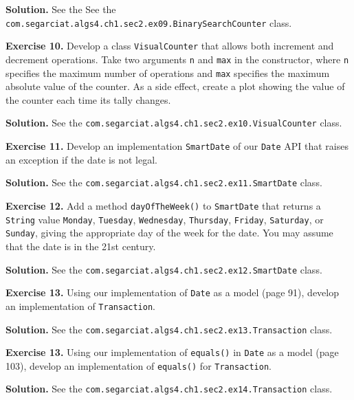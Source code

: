 \documentclass[12pt, a4paper]{article}
\newenvironment{ex}[2][Exercise]
{\par\medskip\noindent \textbf{#1 #2.}}
{\medskip}
\newenvironment{sol}[1][Solution]
{\par\medskip\noindent \textbf{#1.} }
{\medskip}
\begin{document}
	\begin{sol}
		See the See the \texttt{com.segarciat.algs4.ch1.sec2.ex09.BinarySearchCounter} class.
	\end{sol}
	\begin{ex}{10}
		Develop a class \texttt{VisualCounter} that allows both increment and decrement
		operations. Take two arguments \texttt{n} and \texttt{max} in the constructor,
		where \texttt{n} specifies the maximum number of operations and \texttt{max} specifies
		the maximum absolute value of the counter. As a side effect, create a plot showing the
		value of the counter each time its tally changes.
	\end{ex}
	\begin{sol}
		See the \texttt{com.segarciat.algs4.ch1.sec2.ex10.VisualCounter} class.
	\end{sol}
	\begin{ex}{11}
		Develop an implementation \texttt{SmartDate} of our \texttt{Date} API that raises
		an exception if the date is not legal.
	\end{ex}
	\begin{sol}
		See the \texttt{com.segarciat.algs4.ch1.sec2.ex11.SmartDate} class.
	\end{sol}
	\begin{ex}{12}
		Add a method \texttt{dayOfTheWeek()} to \texttt{SmartDate} that returns a \texttt{String}
		value \texttt{Monday}, \texttt{Tuesday}, \texttt{Wednesday}, \texttt{Thursday},
		\texttt{Friday}, \texttt{Saturday}, or \texttt{Sunday}, giving the appropriate
		day of the week for the date. You may assume that the date is in the 21st  century.
	\end{ex}
	\begin{sol}
		See the \texttt{com.segarciat.algs4.ch1.sec2.ex12.SmartDate} class.
	\end{sol}
	\begin{ex}{13}
		Using our implementation of \texttt{Date} as a model (page 91), develop an implementation
		of \texttt{Transaction}.
	\end{ex}
	\begin{sol}
		See the \texttt{com.segarciat.algs4.ch1.sec2.ex13.Transaction} class.
	\end{sol}
	\begin{ex}{13}
		Using our implementation of \texttt{equals()} in \texttt{Date} as a model (page 103),
		develop an implementation of \texttt{equals()} for \texttt{Transaction}.
	\end{ex}
	\begin{sol}
		See the \texttt{com.segarciat.algs4.ch1.sec2.ex14.Transaction} class.
	\end{sol}
	\pagebreak
	\printbibliography
\end{document}
